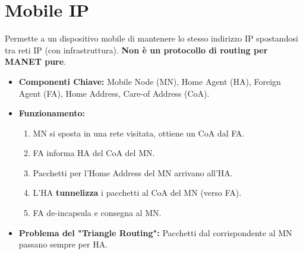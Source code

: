 \documentclass{article}
\begin{document}
\section{Mobile IP}
Permette a un dispositivo mobile di mantenere lo stesso indirizzo IP spostandosi tra reti IP (con infrastruttura). \textbf{Non è un protocollo di routing per MANET pure}.
\begin{itemize}
    \item \textbf{Componenti Chiave:} Mobile Node (MN), Home Agent (HA), Foreign Agent (FA), Home Address, Care-of Address (CoA).
    \item \textbf{Funzionamento:}
    \begin{enumerate}
        \item MN si sposta in una rete visitata, ottiene un CoA dal FA.
        \item FA informa HA del CoA del MN.
        \item Pacchetti per l'Home Address del MN arrivano all'HA.
        \item L'HA \textbf{tunnelizza} i pacchetti al CoA del MN (verso FA).
        \item FA de-incapsula e consegna al MN.
    \end{enumerate}
    \item \textbf{Problema del "Triangle Routing":} Pacchetti dal corrispondente al MN passano sempre per HA.
\end{itemize}
\end{document}
